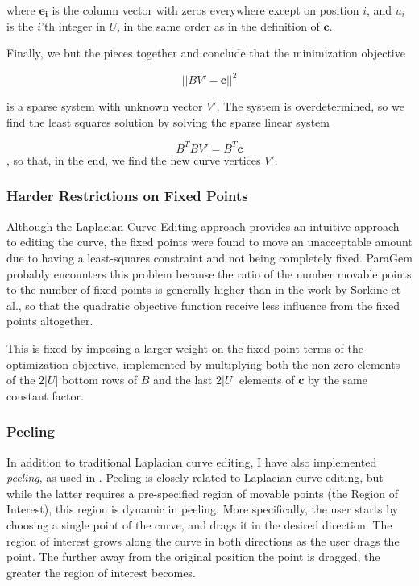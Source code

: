 \documentclass[english]{article}
\begin{document}
where $\mathbf{e_i}$ is the column vector with zeros everywhere except on position $i$, and $u_i$ is the $i$'th integer in $U$, in the same order as in the definition of $\mathbf{c}$.

Finally, we but the pieces together and conclude that the minimization objective

\[
||BV'- \mathbf{c}||^2
\]

is a sparse system with unknown vector $V'$. The system is overdetermined, so we find the least squares solution by solving the sparse linear system

\[
B^TBV' = B^T\mathbf{c}
\],
so that, in the end, we find the new curve vertices $V'$.

\subsubsection{Harder Restrictions on Fixed Points}

Although the Laplacian Curve Editing approach provides an intuitive approach to editing the curve, the fixed points were found to move an unacceptable amount due to having a least-squares constraint and not being completely fixed. ParaGem probably encounters this problem because the ratio of the number movable points to the number of fixed points is generally higher than in the work by Sorkine et al., so that the quadratic objective function receive less influence from the fixed points altogether.

This is fixed by imposing a larger weight on the fixed-point terms of the optimization objective, implemented by multiplying both the non-zero elements of the $2|U|$ bottom rows of $B$ and the last $2|U|$ elements of $\mathbf{c}$ by the same constant factor.

\subsubsection{Peeling}

In addition to traditional Laplacian curve editing, I have also implemented \textit{peeling}, as used in \cite{gingold09}. Peeling is closely related to Laplacian curve editing, but while the latter requires a pre-specified region of movable points (the Region of Interest), this region is dynamic in peeling. More specifically, the user starts by choosing a single point of the curve, and drags it in the desired direction. The region of interest grows along the curve in both directions as the user drags the point. The further away from the original position the point is dragged, the greater the region of interest becomes.
\end{document}
